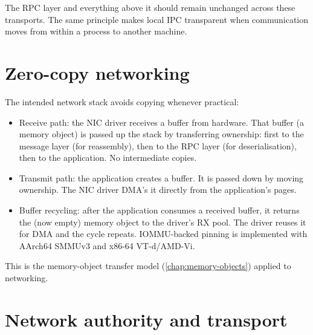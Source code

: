 The RPC layer and everything above it should remain unchanged across these
transports. The same principle makes local IPC transparent when communication
moves from within a process to another machine.

\section{Zero-copy networking}

The intended network stack avoids copying whenever practical:

\begin{itemize}
    \item Receive path: the NIC driver receives a buffer from hardware.
        That buffer (a memory object) is passed up the stack by transferring
        ownership: first to the message layer (for reassembly), then to the
        RPC layer (for deserialisation), then to the application. No intermediate
        copies.
    \item Transmit path: the application creates a buffer. It is passed
        down by moving ownership. The NIC driver DMA's it directly from the
        application's pages.
    \item Buffer recycling: after the application consumes a received
        buffer, it returns the (now empty) memory object to the driver's RX pool.
        The driver reuses it for DMA and the cycle repeats. IOMMU-backed pinning
        is implemented with AArch64 SMMUv3 and x86-64 VT-d/AMD-Vi.
\end{itemize}

This is the memory-object transfer model (\autoref{chap:memory-objects})
applied to networking.

\section{Network authority and transport}

